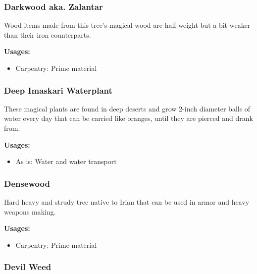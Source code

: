 \subsubsection{Darkwood aka. Zalantar}

Wood items made from this tree's magical wood are half-weight but a bit weaker than their iron counterparts.

\vspace{5mm}

\textbf{Usages:}

\begin{itemize}[noitemsep]
\item[] Carpentry: Prime material
\end{itemize}

\subsubsection{Deep Imaskari Waterplant}
\label{Deep Imaskari Waterplant}

These magical plants are found in deep deserts and grow 2-inch diameter balls of water every day that can be carried like oranges, until they are pierced and drank from.

\vspace{5mm}

\textbf{Usages:}

\begin{itemize}[noitemsep]
\item[] As is: Water and water transport
\end{itemize}

\subsubsection{Densewood}

Hard heavy and strudy tree native to Irian that can be used in armor and heavy weapons making.

\vspace{5mm}

\textbf{Usages:}

\begin{itemize}[noitemsep]
\item[] Carpentry: Prime material
\end{itemize}

\subsubsection{Devil Weed}

